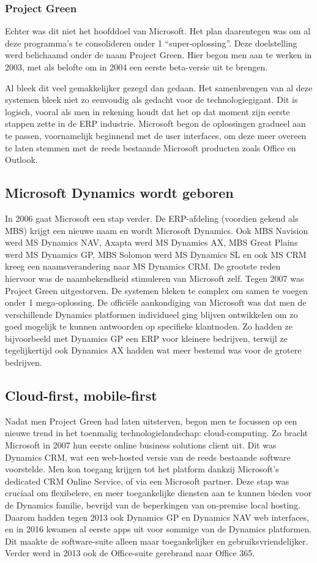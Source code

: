\subsubsection{Project Green }
Echter was dit niet het hoofddoel van Microsoft. Het plan daarentegen was om al deze programma’s te consolideren onder 1 “super-oplossing”. Deze doelstelling werd belichaamd onder de naam Project Green. Hier begon men aan te werken in 2003, met als belofte om in 2004 een eerste beta-versie uit te brengen. 

Al bleek dit veel gemakkelijker gezegd dan gedaan. Het samenbrengen van al deze systemen bleek niet zo eenvoudig als gedacht voor de technologiegigant. Dit is logisch, vooral als men in rekening houdt dat het op dat moment zijn eerste stappen zette in de ERP industrie. Microsoft begon de oplossingen gradueel aan te passen, voornamelijk beginnend met de user interfaces, om deze meer overeen te laten stemmen met de reeds bestaande Microsoft producten zoals Office en Outlook. 


\subsection{Microsoft Dynamics wordt geboren}
In 2006 gaat Microsoft een stap verder. De ERP-afdeling (voordien gekend als MBS) krijgt een nieuwe naam en wordt Microsoft Dynamics. Ook MBS Navision werd MS Dynamics NAV, Axapta werd MS Dynamics AX, MBS Great Plains werd MS Dynamics GP, MBS Solomon werd MS Dynamics SL en ook MS CRM kreeg een naamsverandering naar MS Dynamics CRM. De grootste reden hiervoor was de naambekendheid stimuleren van Microsoft zelf.
Tegen 2007 was Project Green uitgestorven. De systemen bleken te complex om samen te voegen onder 1 mega-oplossing. De officiële aankondiging van Microsoft was dat men de verschillende Dynamics platformen individueel ging blijven ontwikkelen om zo goed mogelijk te kunnen antwoorden op specifieke klantnoden. Zo hadden ze bijvoorbeeld met Dynamics GP een ERP voor kleinere bedrijven, terwijl ze tegelijkertijd ook Dynamics AX hadden wat meer bestemd was voor de grotere bedrijven.   


\subsection{Cloud-first, mobile-first}
Nadat men Project Green had laten uitsterven, begon men te focussen op een nieuwe trend in het toenmalig technologielandschap: cloud-computing.  
Zo bracht Microsoft in 2007 hun eerste online business solutions client uit. Dit was Dynamics CRM, wat een web-hosted versie van de reeds bestaande software voorstelde. Men kon toegang krijgen tot het platform dankzij Microsoft’s dedicated CRM Online Service, of via een Microsoft partner. Deze stap was cruciaal om flexibelere, en meer toegankelijke diensten aan te kunnen bieden voor de Dynamics familie, bevrijd van de beperkingen van on-premise local hosting. 
Daarom hadden tegen 2013 ook Dynamics GP en Dynamics NAV web interfaces, en in 2016 kwamen al eerste apps uit voor sommige van de Dynamics platformen. Dit maakte de software-suite alleen maar toegankelijker en gebruiksvriendelijker. Verder werd in 2013 ook de Office-suite gerebrand naar Office 365.  


